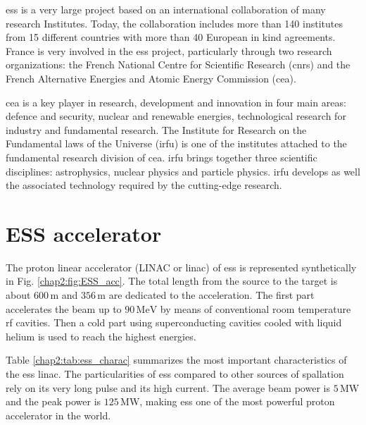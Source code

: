 \begin{refsection}
  \acrshort{ess} is a very large project based on an international collaboration of many research Institutes. Today, the collaboration includes more than 140 institutes from 15 different countries with more than 40 European in kind agreements. France is very involved in the \acrshort{ess} project, particularly through two research organizations: the French National Centre for Scientific Research (\acrshort{cnrs}) and the French Alternative Energies and Atomic Energy Commission (\acrshort{cea}).

  \acrshort{cea} is a key player in research, development and innovation in four main areas: defence and security, nuclear and renewable energies, technological research for industry and fundamental research. The Institute for Research on the Fundamental laws of the Universe (\acrshort{irfu}) is one of the institutes attached to the fundamental research division of \acrshort{cea}. \acrshort{irfu} brings together three scientific disciplines: astrophysics, nuclear physics and particle physics. \acrshort{irfu} develops as well the associated technology required by the cutting-edge research.


  \section{ESS accelerator}
  The proton linear accelerator (LINAC or linac) of \acrshort{ess} is represented synthetically in Fig. \ref{chap2:fig:ESS_acc}.
  The total length from the source to the target is about $600\,\mathrm{m}$ and $356\,\mathrm{m}$ are dedicated to the acceleration. The first part accelerates the beam up to $90\,\mathrm{MeV}$ by means of conventional room temperature \acrshort{rf} cavities. Then a cold part using superconducting cavities cooled with liquid helium is used to reach the highest energies.

  

  Table \ref{chap2:tab:ess_charac} summarizes the most important characteristics of the \acrshort{ess} linac. The particularities of \acrshort{ess} compared to other sources of spallation rely on its very long pulse and its high current. The average beam power is $5\,\mathrm{MW}$ and the peak power is $125\,\mathrm{MW}$, making \acrshort{ess} one of the most powerful proton accelerator in the world.


\end{refsection}
